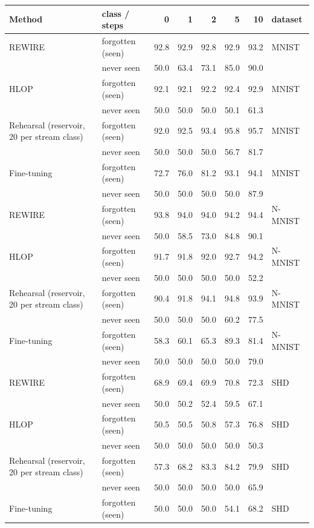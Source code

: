 \begin{tabular*}{\textwidth}{@{\extracolsep{\fill}}llrrrrrl@{}}
\toprule
Method & class / steps & 0 & 1 & 2 & 5 & 10 & dataset \\
\midrule
REWIRE & forgotten (seen) & 92.8 & 92.9 & 92.8 & 92.9 & 93.2 & MNIST \\
 & never seen & 50.0 & 63.4 & 73.1 & 85.0 & 90.0 & \\
HLOP & forgotten (seen) & 92.1 & 92.1 & 92.2 & 92.4 & 92.9 & MNIST \\
 & never seen & 50.0 & 50.0 & 50.0 & 50.1 & 61.3 & \\
Rehearsal (reservoir, 20 per stream class) & forgotten (seen) & 92.0 & 92.5 & 93.4 & 95.8 & 95.7 & MNIST \\
 & never seen & 50.0 & 50.0 & 50.0 & 56.7 & 81.7 & \\
Fine-tuning & forgotten (seen) & 72.7 & 76.0 & 81.2 & 93.1 & 94.1 & MNIST \\
 & never seen & 50.0 & 50.0 & 50.0 & 50.0 & 87.9 & \\
REWIRE & forgotten (seen) & 93.8 & 94.0 & 94.0 & 94.2 & 94.4 & N-MNIST \\
 & never seen & 50.0 & 58.5 & 73.0 & 84.8 & 90.1 & \\
HLOP & forgotten (seen) & 91.7 & 91.8 & 92.0 & 92.7 & 94.2 & N-MNIST \\
 & never seen & 50.0 & 50.0 & 50.0 & 50.0 & 52.2 & \\
Rehearsal (reservoir, 20 per stream class) & forgotten (seen) & 90.4 & 91.8 & 94.1 & 94.8 & 93.9 & N-MNIST \\
 & never seen & 50.0 & 50.0 & 50.0 & 60.2 & 77.5 & \\
Fine-tuning & forgotten (seen) & 58.3 & 60.1 & 65.3 & 89.3 & 81.4 & N-MNIST \\
 & never seen & 50.0 & 50.0 & 50.0 & 50.0 & 79.0 & \\
REWIRE & forgotten (seen) & 68.9 & 69.4 & 69.9 & 70.8 & 72.3 & SHD \\
 & never seen & 50.0 & 50.2 & 52.4 & 59.5 & 67.1 & \\
HLOP & forgotten (seen) & 50.5 & 50.5 & 50.8 & 57.3 & 76.8 & SHD \\
 & never seen & 50.0 & 50.0 & 50.0 & 50.0 & 50.3 & \\
Rehearsal (reservoir, 20 per stream class) & forgotten (seen) & 57.3 & 68.2 & 83.3 & 84.2 & 79.9 & SHD \\
 & never seen & 50.0 & 50.0 & 50.0 & 50.0 & 65.9 & \\
Fine-tuning & forgotten (seen) & 50.0 & 50.0 & 50.0 & 54.1 & 68.2 & SHD \\

\end{tabular*}
